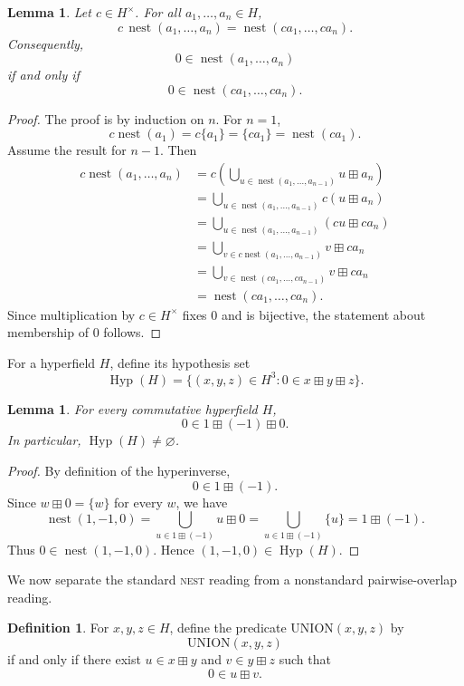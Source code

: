 \documentclass[12pt]{article}
\newtheorem{lemma}[theorem]{Lemma}
\theoremstyle{definition}
\newtheorem{definition}[theorem]{Definition}
\theoremstyle{remark}
\numberwithin{equation}{section}
\newcommand{\nest}{\operatorname{nest}}
\newcommand{\Hyp}{\operatorname{Hyp}}
\newcommand{\UnionPred}{\mathrm{UNION}}
\begin{document}
\begin{lemma}\label{lem:scale-nest}
Let \(c\in H^\times\). For all \(a_1,\dots,a_n\in H\),
\[
c\,\nest(a_1,\dots,a_n)=\nest(ca_1,\dots,ca_n).
\]
Consequently,
\[
0\in \nest(a_1,\dots,a_n)
\]
if and only if
\[
0\in \nest(ca_1,\dots,ca_n).
\]
\end{lemma}

\begin{proof}
The proof is by induction on \(n\). For \(n=1\),
\[
c\nest(a_1)=c\{a_1\}=\{ca_1\}=\nest(ca_1).
\]
Assume the result for \(n-1\). Then
\[
\begin{aligned}
c\nest(a_1,\dots,a_n)
&=c\left(\bigcup_{u\in\nest(a_1,\dots,a_{n-1})} u\boxplus a_n\right)\\
&=\bigcup_{u\in\nest(a_1,\dots,a_{n-1})} c(u\boxplus a_n)\\
&=\bigcup_{u\in\nest(a_1,\dots,a_{n-1})} (cu\boxplus ca_n)\\
&=\bigcup_{v\in c\nest(a_1,\dots,a_{n-1})} v\boxplus ca_n\\
&=\bigcup_{v\in\nest(ca_1,\dots,ca_{n-1})} v\boxplus ca_n\\
&=\nest(ca_1,\dots,ca_n).
\end{aligned}
\]
Since multiplication by \(c\in H^\times\) fixes \(0\) and is bijective, the statement about membership of \(0\) follows.
\end{proof}

For a hyperfield \(H\), define its hypothesis set
\[
\Hyp(H)=\{(x,y,z)\in H^3:0\in x\boxplus y\boxplus z\}.
\]

\begin{lemma}\label{lem:nonvacuous}
For every commutative hyperfield \(H\),
\[
0\in 1\boxplus(-1)\boxplus 0.
\]
In particular, \(\Hyp(H)\neq\varnothing\).
\end{lemma}

\begin{proof}
By definition of the hyperinverse,
\[
0\in 1\boxplus(-1).
\]
Since \(w\boxplus 0=\{w\}\) for every \(w\), we have
\[
\nest(1,-1,0)
=
\bigcup_{u\in 1\boxplus(-1)} u\boxplus 0
=
\bigcup_{u\in 1\boxplus(-1)} \{u\}
=
1\boxplus(-1).
\]
Thus \(0\in\nest(1,-1,0)\). Hence \((1,-1,0)\in\Hyp(H)\).
\end{proof}

We now separate the standard \textsc{nest} reading from a nonstandard pairwise-overlap reading.

\begin{definition}
For \(x,y,z\in H\), define the predicate \(\UnionPred(x,y,z)\) by
\[
\UnionPred(x,y,z)
\]
if and only if there exist \(u\in x\boxplus y\) and \(v\in y\boxplus z\) such that
\[
0\in u\boxplus v.
\]
\end{definition}
\end{document}
